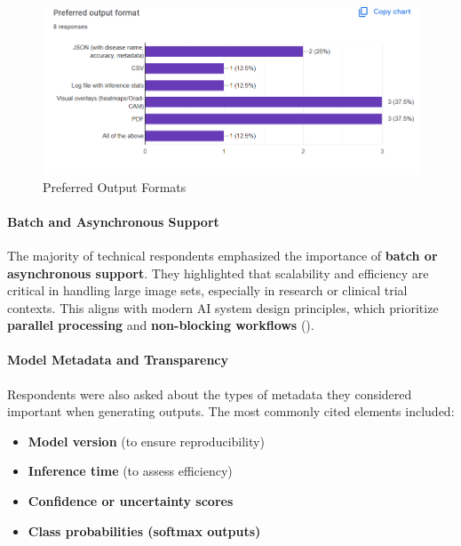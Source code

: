 \documentclass[
  12pt,
  oneside]{article}
\providecommand{\tightlist}{%
  \setlength{\itemsep}{0pt}\setlength{\parskip}{0pt}}
\begin{document}
\begin{figure}

{\centering \includegraphics[width=1\linewidth]{technical-user-chart6} 

}

\caption{Preferred Output Formats}\label{fig:unnamed-chunk-12}
\end{figure}

\paragraph{Batch and Asynchronous
Support}\label{batch-and-asynchronous-support}

The majority of technical respondents emphasized the importance of
\textbf{batch or asynchronous support}. They highlighted that
scalability and efficiency are critical in handling large image sets,
especially in research or clinical trial contexts. This aligns with
modern AI system design principles, which prioritize \textbf{parallel
processing} and \textbf{non-blocking workflows}
().

\paragraph{Model Metadata and
Transparency}\label{model-metadata-and-transparency}

Respondents were also asked about the types of metadata they considered
important when generating outputs. The most commonly cited elements
included:

\begin{itemize}
\tightlist
\item
  \textbf{Model version} (to ensure reproducibility)
\item
  \textbf{Inference time} (to assess efficiency)
\item
  \textbf{Confidence or uncertainty scores}
\item
  \textbf{Class probabilities (softmax outputs)}
\end{itemize}
\end{document}
